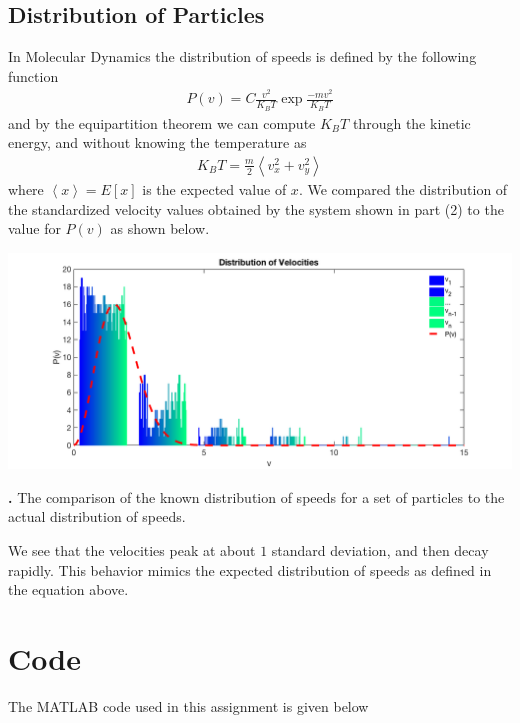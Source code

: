 \documentclass[11.5pt]{article}
\newcommand{\Lbra}{\left\langle}
\newcommand{\Rket}{\right\rangle}
\newcommand{\braket}[1]{\Lbra #1 \Rket}
\newcounter{graphics}
\begin{document}
\pagebreak
\subsection{Distribution of Particles}

In Molecular Dynamics the distribution of speeds is defined by the following function 
\begin{align*}
P(v) = C\frac{v^2}{K_BT}\exp \frac{-mv^2}{K_BT}
\end{align*}
and by the equipartition theorem we can compute $K_BT$ through the kinetic energy, and without knowing the temperature as
\begin{align*}
K_BT = \frac{m}{2}\braket{ v_x^2 + v_y^2 }
\end{align*}
where $\braket{ x} = E[x]$ is the expected value of $x$. We compared the distribution of the standardized velocity values obtained by the system shown in part (2) to the value for $P(v)$ as shown below.
\begin{center}
\includegraphics[width = 6in]{distibutionV.png}\\
\begin{scriptsize}
{\bf {}.} The comparison of the known distribution of speeds for a set of particles to the actual distribution of speeds.
\end{scriptsize}
\end{center}

We see that the velocities peak at about $1$ standard deviation, and then decay rapidly. This behavior mimics the expected distribution of speeds as defined in the equation above. 

\section{Code} 
The MATLAB code used in this assignment is given below




\end{document}
